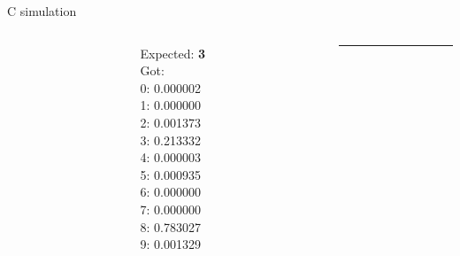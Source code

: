 \documentclass[10pt, xcolor=dvipsnames, compress]{beamer}
\begin{document}
\begin{frame}{C simulation}
\begin{spacing}{0.9}
\begin{columns}[T]
\begin{column}{.15\textwidth}
        \end{column}
        \begin{column}{.15\textwidth}
            \scriptsize
            Expected: \textbf{3}\\[2ex] Got:\\
            0: 0.000002\\
            1: 0.000000\\
            2: 0.001373\\
            3: 0.213332\\
            4: 0.000003\\
            5: 0.000935\\
            6: 0.000000\\
            7: 0.000000\\
            8: 0.783027\\
            9: 0.001329

        \end{column}
        \begin{column}{.01\textwidth}
            \rule{.1mm}{0.4\textheight}
        \end{column}


\end{columns}
\end{spacing}
\end{frame}
\end{document}
